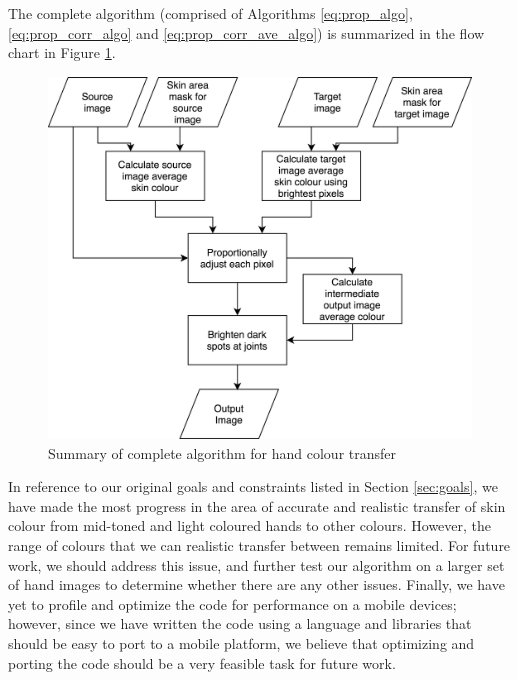 The complete algorithm (comprised of Algorithms \ref{eq:prop_algo}, \ref{eq:prop_corr_algo} and \ref{eq:prop_corr_ave_algo}) is summarized in the flow chart in Figure \ref{img:algo_summary}.

\begin{figure}[H]
    \centering
    \includegraphics[width=\textwidth]{images/algo_diagram}
    \caption{Summary of complete algorithm for hand colour transfer}\label{img:algo_summary}
\end{figure}

In reference to our original goals and constraints listed in Section \ref{sec:goals}, we have made the most progress in the area of accurate and realistic transfer of skin colour from mid-toned and light coloured hands to other colours. However, the range of colours that we can realistic transfer between remains limited. For future work, we should address this issue, and further test our algorithm on a larger set of hand images to determine whether there are any other issues. Finally, we have yet to profile and optimize the code for performance on a mobile devices; however, since we have written the code using a language and libraries that should be easy to port to a mobile platform, we believe that optimizing and porting the code should be a very feasible task for future work.